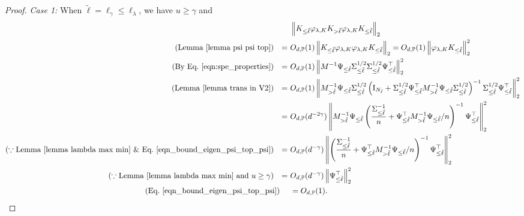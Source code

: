 \documentclass{article}
\theoremstyle{plain}
\theoremstyle{definition}
\theoremstyle{remark}
\begin{document}
\begin{appendix}
\begin{proof}
\textit{Case 1:} When $\tilde{\ell} = \ell_{\gamma} \leq \ell_{\lambda}$, we have $u\geq \gamma$ and 
    \begin{align*}
        &~\left\| K_{\leq \tilde{\ell}} \varphi_{\lambda, K} K_{> \tilde{\ell}}  \varphi_{\lambda, K} K_{\leq \tilde{\ell}}\right\|_{2}\\
       (\text{Lemma } \ref{lemma psi psi top}) \quad {=} &~O_{d, \mathbb{P}}(1) \left\| K_{\leq \tilde{\ell}} \varphi_{\lambda, K}  \varphi_{\lambda, K} K_{\leq \tilde{\ell}}\right\|_{2} = O_{d, \mathbb{P}}(1) \left\|  \varphi_{\lambda, K} K_{\leq \tilde{\ell}}\right\|_{2}^{2}\\
        (\text{By Eq.~\eqref{eqn:spe_properties}}) \quad {=}
        &~
        O_{d, \mathbb{P}}(1) \left\|  M^{-1} \Psi_{\leq \tilde{\ell}} \Sigma_{\leq \tilde{\ell}}^{1/2} \Sigma_{\leq \tilde{\ell}}^{1/2} \Psi_{\leq \tilde{\ell}}^{\top} \right\|_{2}^{2}
        \\
       (\text{Lemma } \ref{lemma trans in V2})\quad {=}
        &~
        O_{d, \mathbb{P}}(1) \left\|M_{>\tilde{\ell}}^{-1} \Psi_{\leq \tilde{\ell}} \Sigma_{\leq \tilde{\ell}}^{1/2} \left( \mathrm{I}_{N_{\tilde{\ell}}} +  \Sigma_{\leq \tilde{\ell}}^{1/2}  \Psi_{\leq \tilde{\ell}}^{\top} M_{>\tilde{\ell}}^{-1} \Psi_{\leq \tilde{\ell}} \Sigma_{\leq \tilde{\ell}}^{1/2}\right)^{-1} \Sigma_{\leq \tilde{\ell}}^{1/2} \Psi_{\leq \tilde{\ell}}^{\top}\right\|_{2}^{2}\\
        =&~
        O_{d, \mathbb{P}}(d^{-2\gamma}) \left\|M_{>\tilde{\ell}}^{-1} \Psi_{\leq \tilde{\ell}}  \left( \frac{\Sigma_{\leq \tilde{\ell}}^{-1}}{n} +  \Psi_{\leq \tilde{\ell}}^{\top} M_{>\tilde{\ell}}^{-1} \Psi_{\leq \tilde{\ell}} /n \right)^{-1} \Psi_{\leq \tilde{\ell}}^{\top}\right\|_{2}^{2}\\
      (\because \text{Lemma \ref{lemma lambda max min} \& Eq.~\eqref{eqn_bound_eigen_psi_top_psi}}) \quad {=}
        &~
        O_{d, \mathbb{P}}(d^{-\gamma}) \left\|  \left( \frac{\Sigma_{\leq \tilde{\ell}}^{-1}}{n} +  \Psi_{\leq \tilde{\ell}}^{\top} M_{>\tilde{\ell}}^{-1} \Psi_{\leq \tilde{\ell}} /n \right)^{-1} \Psi_{\leq \tilde{\ell}}^{\top}\right\|_{2}^{2}\\
        (\because \text{Lemma \ref{lemma lambda max min} and }u\geq \gamma)\quad  {=}
        &~
         O_{d, \mathbb{P}}(d^{-\gamma}) \left\|  \Psi_{\leq \tilde{\ell}}^{\top}\right\|_{2}^{2} \\
         (\text{Eq.~\eqref{eqn_bound_eigen_psi_top_psi}}) \quad &~ =  O_{d, \mathbb{P}}(1).
    \end{align*}




\end{proof}
\end{appendix}
\end{document}

